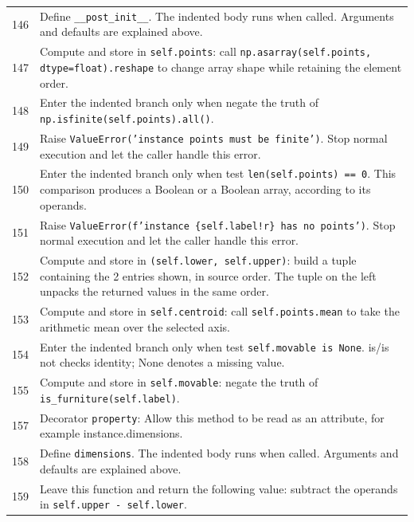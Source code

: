 \documentclass[11pt,a4paper]{book}
\begin{document}
\begin{longtable}{r p{}}
146 & Define \texttt{\_\_post\_init\_\_}. The indented body runs when called. Arguments and defaults are explained above. \\

147 & Compute and store in \texttt{self.points}: call \texttt{np.asarray(self.points, dtype=float).reshape} to change array shape while retaining the element order.  \\

148 & Enter the indented branch only when negate the truth of \texttt{np.isfinite(self.points).all()}. \\

149 & Raise \texttt{ValueError('instance points must be finite')}. Stop normal execution and let the caller handle this error. \\

150 & Enter the indented branch only when test \texttt{len(self.points) == 0}. This comparison produces a Boolean or a Boolean array, according to its operands. \\

151 & Raise \texttt{ValueError(f'instance \{self.label!r\} has no points')}. Stop normal execution and let the caller handle this error. \\

152 & Compute and store in \texttt{(self.lower, self.upper)}: build a tuple containing the 2 entries shown, in source order. The tuple on the left unpacks the returned values in the same order. \\

153 & Compute and store in \texttt{self.centroid}: call \texttt{self.points.mean} to take the arithmetic mean over the selected axis.  \\

154 & Enter the indented branch only when test \texttt{self.movable is None}. is/is not checks identity; None denotes a missing value. \\

155 & Compute and store in \texttt{self.movable}: negate the truth of \texttt{is\_furniture(self.label)}.  \\

157 & Decorator \texttt{property}: Allow this method to be read as an attribute, for example instance.dimensions. \\

158 & Define \texttt{dimensions}. The indented body runs when called. Arguments and defaults are explained above. \\

159 & Leave this function and return the following value: subtract the operands in \texttt{self.upper - self.lower}. \\

\end{longtable}
\end{document}

